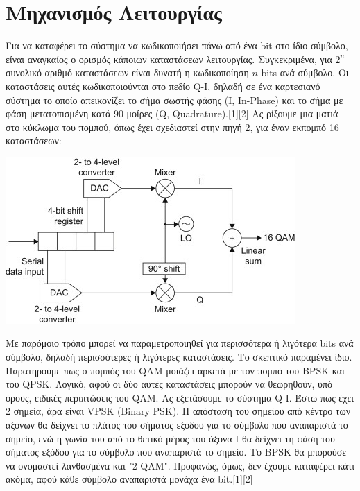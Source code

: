\documentclass{article}
\begin{document}
\section{Μηχανισμός Λειτουργίας}
Για να καταφέρει το σύστημα να κωδικοποιήσει πάνω από ένα bit στο ίδιο σύμβολο, είναι αναγκαίος ο ορισμός κάποιων καταστάσεων λειτουργίας. Συγκεκριμένα, για $2^{n}$ συνολικό αριθμό καταστάσεων είναι δυνατή η κωδικοποίηση $n$ bits ανά σύμβολο. Οι καταστάσεις αυτές κωδικοποιούνται στο πεδίο Q-I, δηλαδή σε ένα καρτεσιανό σύστημα το οποίο απεικονίζει το σήμα σωστής φάσης (I, In-Phase) και το σήμα με φάση μετατοπισμένη κατά 90 μοίρες (Q, Quadrature).[1][2] Ας ρίξουμε μια ματιά στο κύκλωμα του πομπού, όπως έχει σχεδιαστεί στην πηγή 2, για έναν εκπομπό 16 καταστάσεων:
\begin{center}
\includegraphics[scale=1.1]{diktya_pic2_right.jpg}
\end{center}
Με παρόμοιο τρόπο μπορεί να παραμετροποιηθεί για περισσότερα ή λιγότερα bits ανά σύμβολο, δηλαδή περισσότερες ή λιγότερες καταστάσεις. Το σκεπτικό παραμένει ίδιο. Παρατηρούμε πως ο πομπός του QAM μοιάζει αρκετά με τον πομπό του BPSK και του QPSK. Λογικό, αφού οι δύο αυτές καταστάσεις μπορούν να θεωρηθούν, υπό όρους, ειδικές περιπτώσεις του QAM. Ας εξετάσουμε το σύστημα Q-I. Έστω πως έχει 2 σημεία, άρα είναι VPSK (Binary PSK). Η απόσταση του σημείου από κέντρο των αξόνων θα δείχνει το πλάτος του σήματος εξόδου για το σύμβολο που αναπαριστά το σημείο, ενώ η γωνία του από το θετικό μέρος του άξονα I θα δείχνει τη φάση του σήματος εξόδου για το σύμβολο που αναπαριστά το σημείο. Το BPSK θα μπορούσε να ονομαστεί λανθασμένα και "2-QAM". Προφανώς, όμως, δεν έχουμε καταφέρει κάτι ακόμα, αφού κάθε σύμβολο αναπαριστά μονάχα ένα bit.[1][2]
\end{document}
